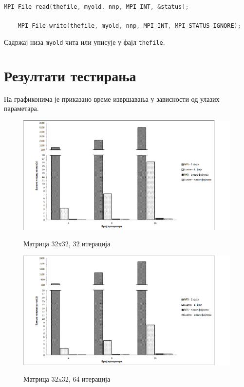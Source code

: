\begin{lstlisting}[style=nonumbers,frame=single,language=C, caption=Функције за читање и писање у фајл]
	MPI_File_read(thefile, myold, nnp, MPI_INT, &status);
	
	MPI_File_write(thefile, myold, nnp, MPI_INT, MPI_STATUS_IGNORE);
\end{lstlisting}
Садржај низа \texttt{myold} чита или уписује у фајл \texttt{thefile}.

\newpage
\section{Резултати тестирања}

На графиконима је приказано време извршавања у зависности од улазих параметара. 
 
 \begin{figure}[H]
   \centering
       \includegraphics[width=1\textwidth]{slike/results/32_32.png}\\[1cm]
   \caption{Матрица 32x32, 32 итерација}
 \end{figure}
 
  \begin{figure}[H]
    \centering
        \includegraphics[width=1\textwidth]{slike/results/32_64.png}\\[1cm]
    \caption{Матрица 32x32, 64 итерација}
  \end{figure}
 
